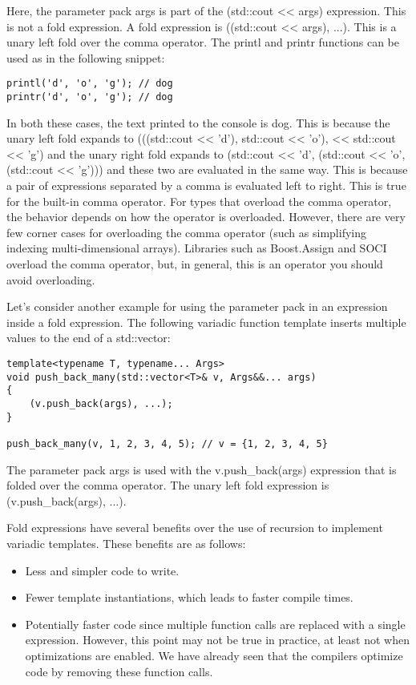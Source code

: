 Here, the parameter pack args is part of the (std::cout << args) expression. This is not a fold expression. A fold expression is ((std::cout << args), ...). This is a unary left fold over the comma operator. The printl and printr functions can be used as in the following snippet:

\begin{lstlisting}[style=styleCXX]
printl('d', 'o', 'g'); // dog
printr('d', 'o', 'g'); // dog
\end{lstlisting}

In both these cases, the text printed to the console is dog. This is because the unary left fold expands to (((std::cout << 'd'), std::cout << 'o'), << std::cout << 'g') and the unary right fold expands to (std::cout << 'd', (std::cout << 'o', (std::cout << 'g'))) and these two are evaluated in the same way. This is because a pair of expressions separated by a comma is evaluated left to right. This is true for the built-in comma operator. For types that overload the comma operator, the behavior depends on how the operator is overloaded. However, there are very few corner cases for overloading the comma operator (such as simplifying indexing multi-dimensional arrays). Libraries such as Boost.Assign and SOCI overload the comma operator, but, in general, this is an operator you should avoid overloading.

Let's consider another example for using the parameter pack in an expression inside a fold expression. The following variadic function template inserts multiple values to the end of a std::vector:

\begin{lstlisting}[style=styleCXX]
template<typename T, typename... Args>
void push_back_many(std::vector<T>& v, Args&&... args)
{
	(v.push_back(args), ...);
}

push_back_many(v, 1, 2, 3, 4, 5); // v = {1, 2, 3, 4, 5}
\end{lstlisting}

The parameter pack args is used with the v.push\_back(args) expression that is folded over the comma operator. The unary left fold expression is (v.push\_back(args), ...).

Fold expressions have several benefits over the use of recursion to implement variadic templates. These benefits are as follows:

\begin{itemize}
\item
Less and simpler code to write.

\item
Fewer template instantiations, which leads to faster compile times.

\item
Potentially faster code since multiple function calls are replaced with a single expression. However, this point may not be true in practice, at least not when optimizations are enabled. We have already seen that the compilers optimize code by removing these function calls.
\end{itemize}


